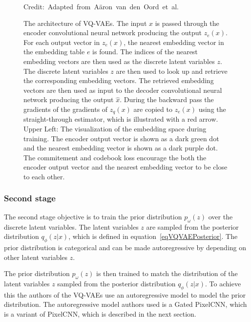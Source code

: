 \begin{figure}
    \centering 
    
    \caption[The architecture of VQ-VAEs.]%
    { 
        The architecture of VQ-VAEs. The input $x$ is passed through the encoder convolutional neural network producing the output $z_e(x)$. For each output vector in $z_e(x)$, the nearest embedding vector in the embedding table $e$ is found. The indices of the nearest embedding vectors are then used as the discrete latent variables $z$. The discrete latent variables $z$ are then used to look up and retrieve the corresponding embedding vectors. The retrieved embedding vectors are then used as input to the decoder convolutional neural network producing the output $\hat{x}$. During the backward pass the gradients of the gradients of $z_q(x)$ are copied to $z_e(x)$ using the straight-through estimator, which is illustrated with a red arrow.
        Upper Left: The visualization of the embedding space during training.  The encoder output vector is shown as a dark green dot and the nearest embedding vector is shown as a dark purple dot. The commitement and codebook loss encourage the both the encoder output vector and the nearest embedding vector to be close to each other.\cite{vqvae}
    }
  	\medskip 
	\hspace*{15pt}\hbox{\scriptsize Credit: Adapted from Aäron van den Oord et al.\cite{vqvae}}\label{VQVAEFigure}
\end{figure}

\subsubsection{Second stage}

The second stage objective is to train the prior distribution $p_{\omega}(z)$ over the discrete latent variables. The latent variables $z$ are sampled from the posterior distribution $q_{\phi}(z|x)$, which is defined in equation~\ref{eqVQVAEPosterior}. The prior distribution is categorical and can be made autoregressive by depending on other latent variables $z$.\cite{vqvae} 

The prior distribution $p_{\omega}(z)$ is then trained to match the distribution of the latent variables $z$ sampled from the posterior distribution $q_{\phi}(z|x)$. To achieve this the authors of the VQ-VAEs use an autoregressive model to model the prior distribution. The autoregressive model authors used is a Gated PixelCNN, which is a variant of PixelCNN, which is described in the next section.\cite{vqvae}


